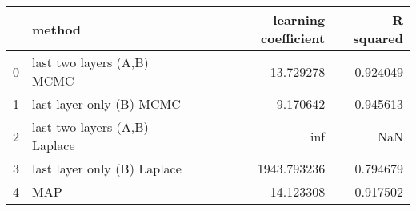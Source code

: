 \begin{tabular}{llrr}
\toprule
{} &                         method &  learning coefficient &  R squared \\
\midrule
0 &     last two layers (A,B) MCMC &             13.729278 &   0.924049 \\
1 &       last layer only (B) MCMC &              9.170642 &   0.945613 \\
2 &  last two layers (A,B) Laplace &                   inf &        NaN \\
3 &    last layer only (B) Laplace &           1943.793236 &   0.794679 \\
4 &                            MAP &             14.123308 &   0.917502 \\
\bottomrule
\end{tabular}

